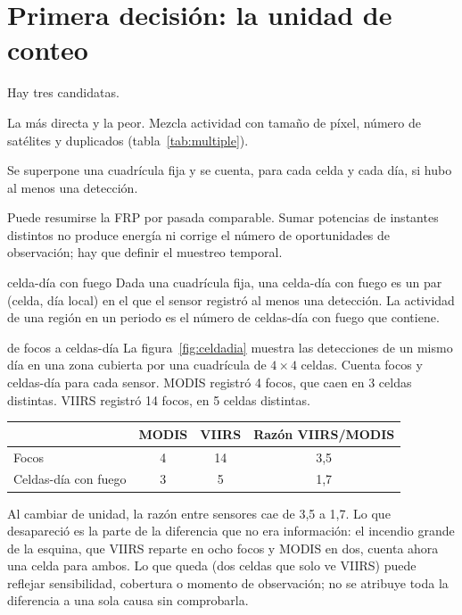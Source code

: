 \section{Primera decisión: la unidad de conteo}

Hay tres candidatas.

\begin{description}[leftmargin=1.2em,style=nextline]
  \item[Número de focos.] La más directa y la peor. Mezcla actividad con tamaño de píxel, número
  de satélites y duplicados (tabla~\ref{tab:multiple}).
  \item[Celdas-día con fuego.] Se superpone una cuadrícula fija y se cuenta, para cada celda y
  cada día, si hubo al menos una detección.
  \item[Resumen de potencia radiativa.] Puede resumirse la FRP por pasada comparable.
  Sumar potencias de instantes distintos no produce energía ni corrige el número de
  oportunidades de observación; hay que definir el muestreo temporal.
\end{description}

\begin{definicion}{celda-día con fuego}
Dada una cuadrícula fija, una celda-día con fuego es un par (celda, día local) en el que el
sensor registró al menos una detección. La actividad de una región en un periodo es el número de
celdas-día con fuego que contiene.
\end{definicion}

\begin{ejemplo}{de focos a celdas-día}
La figura~\ref{fig:celdadia} muestra las detecciones de un mismo día en una zona cubierta por
una cuadrícula de $4\times4$ celdas. Cuenta focos y celdas-día para cada sensor.
\solucion MODIS registró 4 focos, que caen en 3 celdas distintas. VIIRS registró 14 focos, en 5
celdas distintas.
\begin{center}
\begin{tabular}{lccc}
\toprule
 & MODIS & VIIRS & Razón VIIRS/MODIS \\
\midrule
Focos & 4 & 14 & 3,5 \\
Celdas-día con fuego & 3 & 5 & 1,7 \\
\bottomrule
\end{tabular}
\end{center}
Al cambiar de unidad, la razón entre sensores cae de 3,5 a 1,7. Lo que desapareció es la parte
de la diferencia que no era información: el incendio grande de la esquina, que VIIRS reparte en
ocho focos y MODIS en dos, cuenta ahora una celda para ambos. Lo que queda (dos celdas que solo
ve VIIRS) puede reflejar sensibilidad, cobertura o momento de observación; no se atribuye
toda la diferencia a una sola causa sin comprobarla.
\end{ejemplo}

